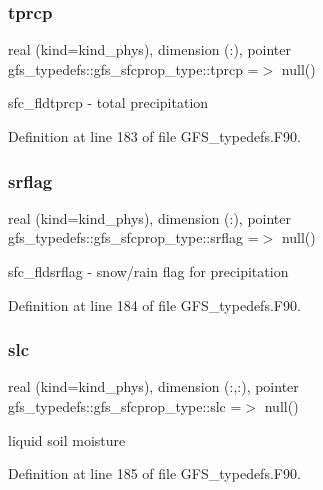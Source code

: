 \subsubsection{tprcp}
{\footnotesize\ttfamily real (kind=kind\+\_\+phys), dimension  (\+:), pointer gfs\+\_\+typedefs\+::gfs\+\_\+sfcprop\+\_\+type\+::tprcp =$>$ null()}



sfc\+\_\+fldtprcp -\/ total precipitation 



Definition at line 183 of file G\+F\+S\+\_\+typedefs.\+F90.

\mbox{\label{structgfs__typedefs_1_1gfs__sfcprop__type_a7665e7bb616c46935ed4fd53d594c5ed}} 
\subsubsection{srflag}
{\footnotesize\ttfamily real (kind=kind\+\_\+phys), dimension (\+:), pointer gfs\+\_\+typedefs\+::gfs\+\_\+sfcprop\+\_\+type\+::srflag =$>$ null()}



sfc\+\_\+fldsrflag -\/ snow/rain flag for precipitation 



Definition at line 184 of file G\+F\+S\+\_\+typedefs.\+F90.

\mbox{\label{structgfs__typedefs_1_1gfs__sfcprop__type_a575371f26aec125711b187db5cf2dcb8}} 
\subsubsection{slc}
{\footnotesize\ttfamily real (kind=kind\+\_\+phys), dimension    (\+:,\+:), pointer gfs\+\_\+typedefs\+::gfs\+\_\+sfcprop\+\_\+type\+::slc =$>$ null()}



liquid soil moisture 



Definition at line 185 of file G\+F\+S\+\_\+typedefs.\+F90.

\mbox{\label{structgfs__typedefs_1_1gfs__sfcprop__type_a5509f0498d928c217728e38baddfa68e}} 
